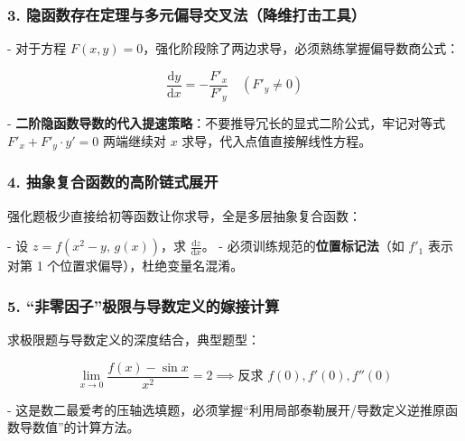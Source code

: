\documentclass[11pt,a4paper,UTF8]{ctexart}
\begin{document}
\subsubsection{3. 隐函数存在定理与多元偏导交叉法（降维打击工具）}

-   对于方程 $F(x, y) = 0$，强化阶段除了两边求导，必须熟练掌握偏导数商公式：


\begin{equation*}
\frac{\mathrm{d}y}{\mathrm{d}x} = -\frac{F'_x}{F'_y} \quad (F'_y \neq 0)
\end{equation*}

-   \textbf{二阶隐函数导数的代入提速策略}：不要推导冗长的显式二阶公式，牢记对等式 $F'_x + F'_y \cdot y' = 0$ 两端继续对 $x$ 求导，代入点值直接解线性方程。


\subsubsection{4. 抽象复合函数的高阶链式展开}

强化题极少直接给初等函数让你求导，全是多层抽象复合函数：

-   设 $z = f(x^2 - y, \, g(x))$，求 $\frac{\mathrm{d}z}{\mathrm{d}x}$。
-   必须训练规范的\textbf{位置标记法}（如 $f'_1$ 表示对第 1 个位置求偏导），杜绝变量名混淆。


\subsubsection{5. “非零因子”极限与导数定义的嫁接计算}

求极限题与导数定义的深度结合，典型题型：


\begin{equation*}
\lim_{x \to 0} \frac{f(x) - \sin x}{x^2} = 2 \implies \text{反求 } f(0), f'(0), f''(0)
\end{equation*}

-   这是数二最爱考的压轴选填题，必须掌握“利用局部泰勒展开/导数定义逆推原函数导数值”的计算方法。
\end{document}
